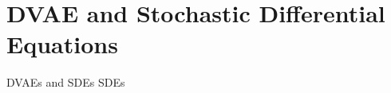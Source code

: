 \section{DVAE and Stochastic Differential Equations}\label{DVAEs and SDEs}

\begin{frame}{DVAEs and SDEs}
    SDEs
\end{frame}